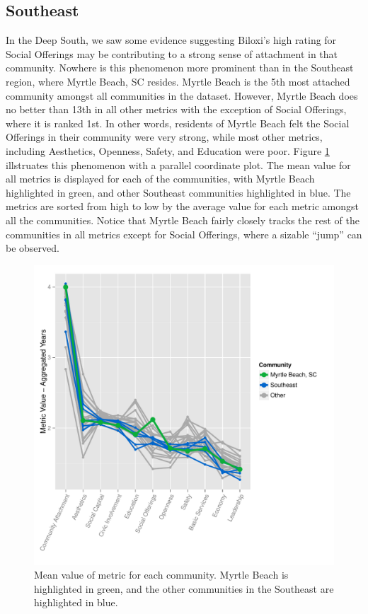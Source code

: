 \documentclass[11pt]{article}\usepackage{knitr}
\begin{document}
\subsection*{Southeast}
In the Deep South, we saw some evidence suggesting Biloxi's high rating for Social Offerings may be contributing to a strong sense of attachment in that community. Nowhere is this phenomenon more prominent than in the Southeast region, where Myrtle Beach, SC resides. Myrtle Beach is the 5th most attached community amongst all communities in the dataset. However, Myrtle Beach does no better than 13th in all other metrics with the exception of Social Offerings, where it is ranked 1st. In other words, residents of Myrtle Beach felt the Social Offerings in their community were very strong, while most other metrics, including Aesthetics, Openness, Safety, and Education were poor. Figure \ref{fig:southeast_one} illstruates this phenomenon with a parallel coordinate plot. The mean value for all metrics is displayed for each of the communities, with Myrtle Beach highlighted in green, and other Southeast communities highlighted in blue. The metrics are sorted from high to low by the average value for each metric amongst all the communities. Notice that Myrtle Beach fairly closely tracks the rest of the communities in all metrics except for Social Offerings, where a sizable ``jump'' can be observed.

\begin{knitrout}
\color{fgcolor}\begin{figure}[H]

\includegraphics[width=\maxwidth]{figure/southeast_one} \caption[Mean value of metric for each community]{Mean value of metric for each community. Myrtle Beach is highlighted in green, and the other communities in the Southeast are highlighted in blue.\label{fig:southeast_one}}
\end{figure}


\end{knitrout}
\end{document}
